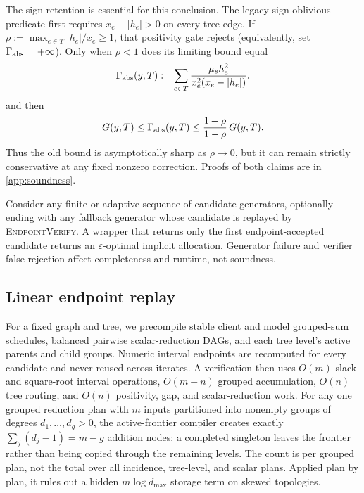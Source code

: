 \documentclass[smallextended,envcountsect]{svjour3}
\begin{document}
The sign retention is essential for this conclusion.  The legacy
sign-oblivious predicate first requires $x_e-|h_e|>0$ on every tree edge.
If $\rho:=\max_{e\in T}|h_e|/x_e\ge 1$, that positivity gate rejects
(equivalently, set $\Gamma_{\rm abs}=+\infty$).  Only when $\rho<1$ does its
limiting bound equal
\begin{equation}
 \Gamma_{\rm abs}(y,T):=
 \sum_{e\in T}\frac{\mu_eh_e^2}
 {x_e^2(x_e-|h_e|)}.
 \label{eq:limiting-conservative-gap}
\end{equation}
and then
\begin{equation}
 G(y,T)\le\Gamma_{\rm abs}(y,T)
 \le\frac{1+\rho}{1-\rho}\,G(y,T).
 \label{eq:absolute-sharpness}
\end{equation}
Thus the old bound is asymptotically sharp as $\rho\to0$, but it can remain
strictly conservative at any fixed nonzero correction.  Proofs of both claims
are in \cref{app:soundness}.

\begin{corollary}
\label{cor:wrapper}
Consider any finite or adaptive sequence of candidate generators, optionally
ending with any fallback generator whose candidate is replayed by
\textnormal{\textsc{EndpointVerify}}.  A wrapper that returns only the first
endpoint-accepted candidate returns an $\varepsilon$-optimal implicit allocation.
Generator failure and verifier false rejection affect completeness and runtime,
not soundness.
\end{corollary}

\subsection{Linear endpoint replay}

For a fixed graph and tree, we precompile stable client and model grouped-sum
schedules, balanced pairwise scalar-reduction DAGs, and each tree level's active
parents and child groups.  Numeric interval endpoints are recomputed for every
candidate and never reused across iterates.  A verification then uses $O(m)$
slack and square-root interval operations, $O(m+n)$ grouped accumulation,
$O(n)$ tree routing, and $O(n)$ positivity, gap, and scalar-reduction work.
For any one grouped reduction plan with $m$ inputs partitioned into nonempty
groups of degrees $d_1,\ldots,d_g>0$, the active-frontier compiler creates
exactly $\sum_j(d_j-1)=m-g$ addition nodes: a completed singleton leaves the
frontier rather than being copied through the remaining levels.  The count is
per grouped plan, not the total over all incidence, tree-level, and scalar
plans.  Applied plan by plan, it rules out a hidden $m\log d_{\max}$ storage
term on skewed topologies.
\end{document}
